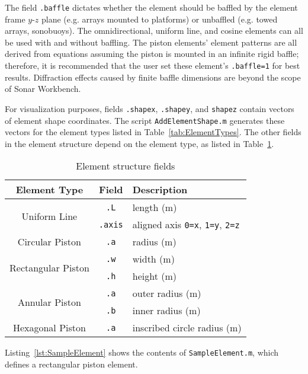 The field \texttt{.baffle} dictates whether the element should be baffled by the element frame $y$-$z$ plane (e.g. arrays mounted to platforms) or unbaffled (e.g. towed arrays, sonobuoys). The omnidirectional, uniform line, and cosine elements can all be used with and without baffling. The piston elements' element patterns are all derived from equations assuming the piston is mounted in an infinite rigid baffle; therefore, it is recommended that the user set these element's \texttt{.baffle=1} for best results. Diffraction effects caused by finite baffle dimensions are beyond the scope of Sonar Workbench. 

For visualization purposes, fields \texttt{.shapex}, \texttt{.shapey}, and \texttt{shapez} contain vectors of element shape coordinates. The script \texttt{AddElementShape.m} generates these vectors for the element types listed in Table~\ref{tab:ElementTypes}. The other fields in the element structure depend on the element type, as listed in Table~\ref{tab:ElementFields}.

\begin{table}[!ht]
	\begin{center}
		\caption{Element structure fields}
		\label{tab:ElementFields}
		\begin{tabular}{c|c|l} 
			\textbf{Element Type} & \textbf{Field} & \textbf{Description} \\
			\hline
			\multirow{2}{*}{Uniform Line} & \texttt{.L} & length (m) \\
			& \texttt{.axis} & aligned axis \texttt{0=x}, \texttt{1=y}, \texttt{2=z} \\
			\hline
			Circular Piston & \texttt{.a} & radius (m) \\
			\hline
			\multirow{2}{*}{Rectangular Piston} & \texttt{.w} & width (m) \\
			& \texttt{.h} & height (m) \\
			\hline
			\multirow{2}{*}{Annular Piston} & \texttt{.a} & outer radius (m) \\
			& \texttt{.b} & inner radius (m) \\
			\hline
			Hexagonal Piston & \texttt{.a} & inscribed circle radius (m) \\	
		\end{tabular}
	\end{center}
\end{table}

Listing~\ref{lst:SampleElement} shows the contents of \texttt{SampleElement.m}, which defines a rectangular piston element.

